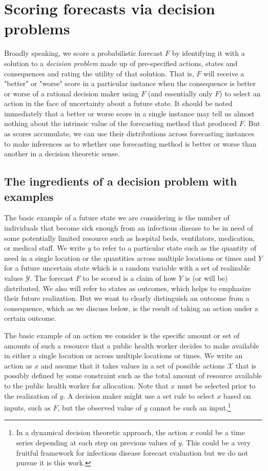 \documentclass{article}
\begin{document}
\section{Scoring forecasts via decision problems}

Broadly speaking, we score a probabilistic forecast $F$ by identifying it with a solution to a \emph{decision problem} made up of pre-specified actions, states and consequences and rating the utility of that solution.  That is, $F$ will receive a "better" or "worse" score in a particular instance when the consequence is better or worse of a rational decision maker using $F$ (and essentially only $F$) to select an action in the face of uncertainty about a future state.  It should be noted immediately that a better or worse score in a single instance may tell us almost nothing about the intrinsic value of the forecasting method that produced $F$.  But as scores accumulate, we can use their distributions across forecasting instances to make inferences as to whether one forecasting method is better or worse than another in a decision theoretic sense. 

\subsection{The ingredients of a decision problem with examples}
The basic example of a future state we are considering is the number of individuals that become sick enough from an infectious disease to be in need of some potentially limited resource such as hospital beds, ventilators, medication, or medical staff.  We write $y$ to refer to a particular state such as the quantity of need in a single location or the quantities across multiple locations or times and $Y$ for a future uncertain state which is a random variable with a set of realizable values $\mathcal{Y}$. The forecast $F$ to be scored is a claim of how $Y$ is (or will be) distributed. We also will refer to states as outcomes, which helps to emphasize their future realization.  But we want to clearly distinguish an outcome from a consequence, which as we discuss below, is the result of taking an action under a certain outcome.

The basic example of an action we consider is the specific amount or set of amounts of such a resource that a public health worker decides to make available in either a single location or across multiple locations or times.  We write an action as $x$ and assume that it takes values in a set of possible actions $\mathcal{X}$ that is possibly defined by some constraint such as the total amount of resource available to the public health worker for allocation.  Note that $x$ must be selected prior to the realization of $y$.  A decision maker might use a set rule to select $x$ based on inputs, such as $F$, but the observed value of $y$ cannot be such an input.\footnote{In a dynamical decision theoretic approach, the action $x$ could be a time series depending at each step on previous values of $y$.  This could be a very fruitful framework for infectious disease forecast evaluation but we do not pursue it is this work.}
\end{document}
